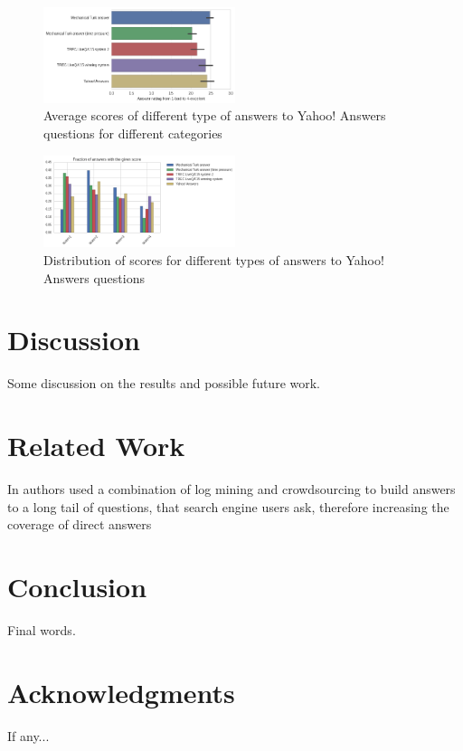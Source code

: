 \documentclass[11pt,letterpaper]{article}
\begin{document}
\begin{figure}[h]
\centering
\includegraphics[width=0.5\textwidth]{img/average_score}
\caption{Average scores of different type of answers to Yahoo! Answers questions for different categories}
\label{fig:average_score}
\end{figure}

\begin{figure}[h]
\centering
\includegraphics[width=0.5\textwidth]{img/scores_distribution}
\caption{Distribution of scores for different types of answers to Yahoo! Answers questions}
\label{fig:scores_distribution}
\end{figure}

\section{Discussion}
\label{sec:discussion}

Some discussion on the results and possible future work.

\section{Related Work}
\label{sec:related_work}

In \cite{bernstein2012direct} authors used a combination of log mining and crowdsourcing to build answers to a long tail of questions, that search engine users ask, therefore increasing the coverage of direct answers

\section{Conclusion}
\label{sec:conclusion}

Final words.

\section*{Acknowledgments}

If any...



\end{document}
